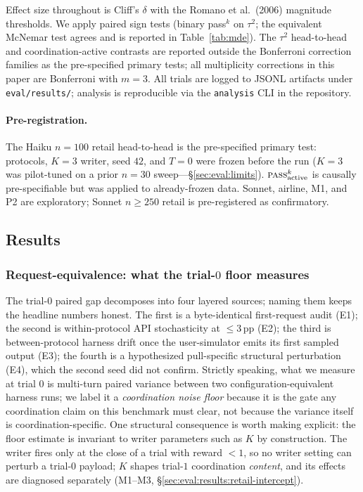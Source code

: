 Effect size throughout is Cliff's $\delta$ with the Romano et
al.\ (2006) magnitude thresholds. We apply paired sign tests
(binary pass$^k$ on $\tau^2$; the equivalent McNemar test agrees
and is reported in Table~\ref{tab:mde}). The $\tau^2$
head-to-head and coordination-active contrasts are reported
outside the Bonferroni correction families as the pre-specified
primary tests; all multiplicity corrections in this paper are
Bonferroni with $m{=}3$. All trials are logged to JSONL artifacts under
\texttt{eval/results/}; analysis is reproducible via the
\texttt{analysis} CLI in the repository.

\paragraph{Pre-registration.}  The Haiku $n{=}100$ retail
head-to-head is the pre-specified primary test: protocols,
$K{=}3$ writer, seed $42$, and $T{=}0$ were frozen before the run
($K{=}3$ was pilot-tuned on a prior $n{=}30$
sweep---\S\ref{sec:eval:limits}).
$\textsc{pass}^k_{\mathrm{active}}$ is causally pre-specifiable but
was applied to already-frozen data.  Sonnet, airline, M1, and P2
are exploratory; Sonnet $n{\geq}250$ retail is pre-registered as
confirmatory.


\subsection{Results}
\label{sec:eval:results}

\subsubsection{Request-equivalence: what the trial-$0$ floor
measures}
\label{sec:eval:request-equivalence}

The trial-$0$ paired gap decomposes into four layered sources;
naming them keeps the headline numbers honest. The first is a
byte-identical first-request audit (E1); the second is
within-protocol API stochasticity at $\leq 3$\,pp (E2); the
third is between-protocol harness drift once the user-simulator
emits its first sampled output (E3); the fourth is a
hypothesized pull-specific structural perturbation (E4), which
the second seed did not confirm.
Strictly speaking, what we measure at trial $0$ is multi-turn
paired variance between two configuration-equivalent harness
runs; we label it a \emph{coordination noise floor} because it
is the gate any coordination claim on this benchmark must
clear, not because the variance itself is coordination-specific.
One structural consequence is worth making explicit: the floor
estimate is invariant to writer parameters such as $K$ by
construction. The writer fires only at the close of a trial with
reward $<1$, so no writer setting can perturb a trial-$0$
payload; $K$ shapes trial-$1$ coordination \emph{content}, and
its effects are diagnosed separately (M1--M3,
\S\ref{sec:eval:results:retail-intercept}).

